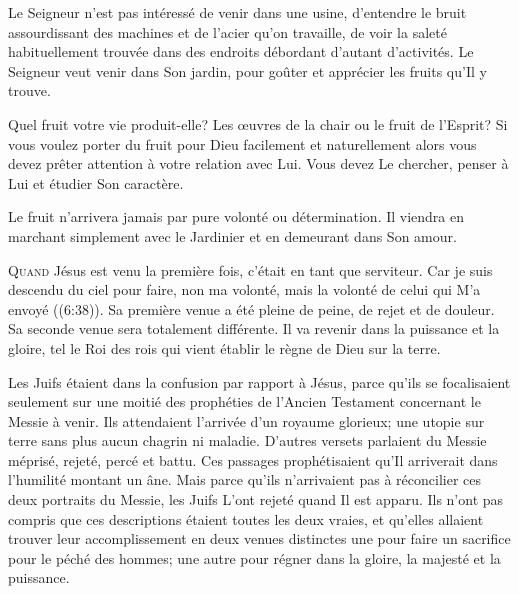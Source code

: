Le Seigneur n'est pas intéressé de venir dans une usine,
 d'entendre le bruit assourdissant des machines et de l'acier qu'on travaille,
 de voir la saleté habituellement trouvée dans des endroits
 débordant d'autant  d'activités.
 Le Seigneur veut venir dans Son jardin, pour goûter et apprécier
 les fruits qu'Il y trouve.

Quel fruit votre vie produit-elle? Les \oe{}uvres de la chair
 ou le fruit de l'Esprit? Si vous voulez porter du fruit pour Dieu
 \ocadr facilement et naturellement \fcadr{} alors vous devez prêter
 attention à votre relation avec Lui. Vous devez Le chercher,
 penser à Lui et étudier Son caractère.

Le fruit n'arrivera jamais par pure volonté ou détermination.
 Il viendra en marchant simplement avec le Jardinier
 et en demeurant dans Son amour.

\dvrule







\lettrine{Q}{uand} Jésus est venu la première fois,
 c'était en tant que serviteur.
 \Og Car je suis descendu du ciel pour faire, non ma volonté,
 mais la volonté de celui qui M'a envoyé \Fg{} ((6:38)).
 Sa première venue a été pleine de peine, de rejet et de douleur.
 Sa seconde venue sera totalement différente.
 Il va revenir dans la puissance et la gloire, tel
 \Og le  Roi des rois \Fg{} 
 qui vient établir le règne de Dieu sur la terre.

Les Juifs étaient dans la confusion par rapport à Jésus,
 parce qu'ils se focalisaient seulement sur une moitié des prophéties
 de l'Ancien Testament concernant le Messie à venir.
 Ils attendaient l'arrivée d'un royaume glorieux;
 une utopie sur terre sans plus aucun chagrin ni maladie.
 D'autres versets parlaient du Messie méprisé, rejeté, percé et battu.
 Ces passages prophétisaient qu'Il arriverait dans l'humilité montant un âne.
 Mais parce qu'ils n'arrivaient pas à réconcilier ces deux portraits
 du Messie, les Juifs L'ont rejeté quand Il est apparu.
 Ils n'ont pas compris que ces descriptions étaient toutes les deux vraies,
 et qu'elles allaient trouver leur accomplissement en deux venues distinctes\frcolon{}
 une pour faire un sacrifice pour le péché des hommes;
 une autre pour régner dans la gloire, la majesté et la puissance.

